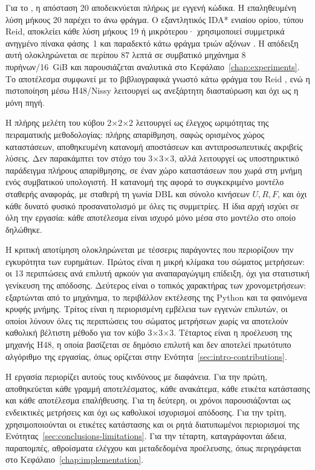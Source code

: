 Για το , η απόσταση 20 αποδεικνύεται πλήρως με εγγενή κώδικα. Η επαληθευμένη λύση μήκους 20 παρέχει το άνω φράγμα. Ο εξαντλητικός IDA* ενιαίου ορίου, τύπου Reid, αποκλείει κάθε λύση μήκους 19 ή μικρότερου· χρησιμοποιεί συμμετρικά ανηγμένο πίνακα φάσης~1 και παραδεκτό κάτω φράγμα τριών αξόνων \cite{reid1997optimal}. Η απόδειξη αυτή ολοκληρώνεται σε περίπου 87 λεπτά σε συμβατικό μηχάνημα 8 πυρήνων/16~GiB και παρουσιάζεται αναλυτικά στο Κεφάλαιο~\ref{chap:experiments}. Το αποτέλεσμα συμφωνεί με το βιβλιογραφικά γνωστό κάτω φράγμα του Reid \cite{reid1995superflip}, ενώ η πιστοποίηση μέσω H48/Nissy λειτουργεί ως ανεξάρτητη διασταύρωση και όχι ως η μόνη πηγή.

Η πλήρης μελέτη του κύβου 2×2×2 λειτουργεί ως έλεγχος ωριμότητας της πειραματικής μεθοδολογίας: πλήρης απαρίθμηση, σαφώς ορισμένος χώρος καταστάσεων, αποθηκευμένη κατανομή αποστάσεων και αντιπροσωπευτικές ακριβείς λύσεις. Δεν παρακάμπτει τον στόχο του 3×3×3, αλλά λειτουργεί ως υποστηρικτικό παράδειγμα πλήρους απαρίθμησης, σε έναν χώρο καταστάσεων που χωρά στη μνήμη ενός συμβατικού υπολογιστή. Η κατανομή της αφορά το συγκεκριμένο μοντέλο σταθερής αναφοράς, με σταθερή τη γωνία DBL και σύνολο κινήσεων \(U,R,F\), και όχι κάθε δυνατό φυσικό προσανατολισμό με όλες τις συμμετρίες. Η ίδια αρχή ισχύει σε όλη την εργασία: κάθε αποτέλεσμα είναι ισχυρό μόνο μέσα στο μοντέλο στο οποίο δηλώθηκε.

Η κριτική αποτίμηση ολοκληρώνεται με τέσσερις παράγοντες που περιορίζουν την εγκυρότητα των ευρημάτων. Πρώτος είναι η μικρή κλίμακα του σώματος μετρήσεων: οι 13 περιπτώσεις ανά επιλυτή αρκούν για αναπαραγώγιμη επίδειξη, όχι για στατιστική γενίκευση της απόδοσης. Δεύτερος είναι ο τοπικός χαρακτήρας των χρονομετρήσεων: εξαρτώνται από το μηχάνημα, το περιβάλλον εκτέλεσης της Python και τα φαινόμενα κρυφής μνήμης. Τρίτος είναι η περιορισμένη εμβέλεια των εγγενών επιλυτών, οι οποίοι λύνουν όλες τις περιπτώσεις του σώματος μετρήσεων χωρίς να αποτελούν καθολική βέλτιστη μέθοδο για τον κύβο 3×3×3. Τέταρτος είναι η προέλευση της μηχανής H48, η οποία βασίζεται σε δημόσιο επιλυτή και δεν αποτελεί πρωτότυπο αλγόριθμο της εργασίας, όπως ορίζεται στην Ενότητα~\ref{sec:intro-contributions}.

Η εργασία περιορίζει αυτούς τους κινδύνους με διαφάνεια. Για την πρώτη, αποθηκεύεται κάθε γραμμή αποτελέσματος, κάθε ανακάτεμα, κάθε ετικέτα κατάστασης και κάθε αποτέλεσμα επαλήθευσης. Για τη δεύτερη, οι χρόνοι παρουσιάζονται ως ενδεικτικές μετρήσεις και όχι ως καθολικοί ισχυρισμοί απόδοσης. Για την τρίτη, χρησιμοποιούνται οι ετικέτες κατάστασης και οι ρητά διατυπωμένοι περιορισμοί της Ενότητας~\ref{sec:conclusions-limitations}. Για την τέταρτη, καταγράφονται άδεια, παραπομπές, αθροίσματα ελέγχου και μεταδεδομένα προέλευσης, όπως περιγράφεται στο Κεφάλαιο~\ref{chap:implementation}.

